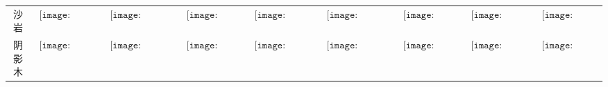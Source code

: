\begin{longtable}{|c|cccccccc|}
沙岩&$\begin{array}{c}\texttt{[image: figures/Sandstone\_Candle.png]}\end{array}$&$\begin{array}{c}\texttt{[image: figures/Sandstone\_Candelabra.png]}\end{array}$&$\begin{array}{c}\texttt{[image: figures/Sandstone\_Lamp.png]}\end{array}$&$\begin{array}{c}\texttt{[image: figures/Sandstone\_Lantern.png]}\end{array}$&$\begin{array}{c}\texttt{[image: figures/Sandstone\_Chandelier.png]}\end{array}$&$\begin{array}{c}\texttt{[image: figures/Sandstone\_Door.png]}\end{array}$&$\begin{array}{c}\texttt{[image: figures/Sandstone\_Toilet.png]}\end{array}$&$\begin{array}{c}\texttt{[image: figures/Sandstone\_Chest.png]}\end{array}$\\
阴影木&$\begin{array}{c}\texttt{[image: figures/Shadewood\_Candle.png]}\end{array}$&$\begin{array}{c}\texttt{[image: figures/Shadewood\_Candelabra.png]}\end{array}$&$\begin{array}{c}\texttt{[image: figures/Shadewood\_Lamp.png]}\end{array}$&$\begin{array}{c}\texttt{[image: figures/Shadewood\_Lantern.png]}\end{array}$&$\begin{array}{c}\texttt{[image: figures/Shadewood\_Chandelier.png]}\end{array}$&$\begin{array}{c}\texttt{[image: figures/Shadewood\_Door.png]}\end{array}$&$\begin{array}{c}\texttt{[image: figures/Shadewood\_Toilet.png]}\end{array}$&$\begin{array}{c}\texttt{[image: figures/Shadewood\_Chest.png]}\end{array}$\\

\end{longtable}
